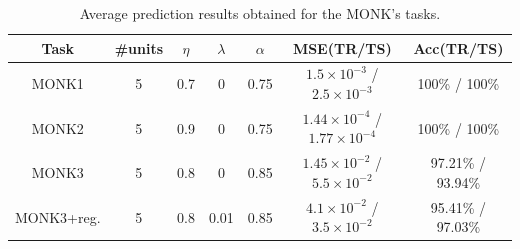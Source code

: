 \begin{center}
    \begin{table}[H]
        \centering
        \small
        \begin{tabular}{|c|c|c|c|c|c|c|}
            \hline
            \textbf{Task} & \textbf{\#units} & \textbf{$\eta$} & \textbf{$\lambda$} & \textbf{$\alpha$} & \textbf{MSE(TR/TS)} & \textbf{Acc(TR/TS)}\\ \hline
            
            MONK1 & 5  & 0.7 & 0 & 0.75 &  $1.5\times 10^{-3}$ / $2.5\times 10^{-3}$ & 100{\%} / 100{\%}\\ \hline
            
            MONK2 & 5 & 0.9 & 0 & 0.75 & $1.44\times 10^{-4}$ / $1.77\times 10^{-4}$ & 100{\%} / 100{\%} \\ \hline
            
            MONK3 & 5 & 0.8 & 0 & 0.85 & $1.45\times 10^{-2}$ / $5.5\times 10^{-2}$ & 97.21{\%} / 93.94{\%} \\ \hline
            
            MONK3+reg. & 5 & 0.8 & 0.01 & 0.85 & $4.1\times 10^{-2}$ / $3.5\times 10^{-2}$ & 95.41{\%} / 97.03{\%} \\ 
            
            \hline
        \end{tabular}
        \caption{Average prediction results obtained for the MONK’s tasks.}
        \label{tab:monk-table}
    \end{table}
\end{center}
